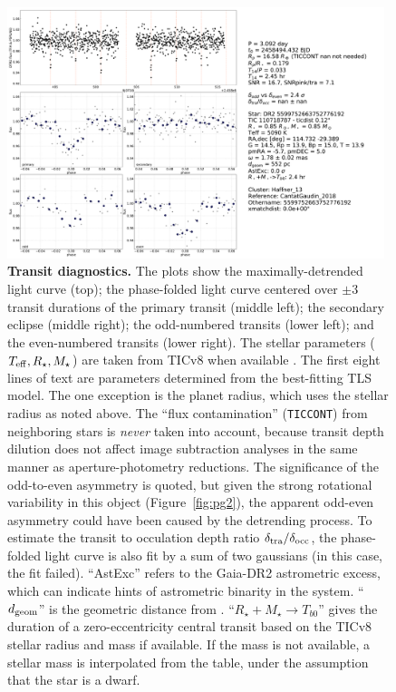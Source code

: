 \documentclass[12pt,twocolumn,tighten]{aastex62}
\begin{document}
\begin{figure}[!h]
	\begin{center}
		\leavevmode
		\includegraphics[width=0.98\textwidth]{gaiatwo0005599752663752776192-0007_page03.pdf}
	\end{center}
	\vspace{-0.5cm}
	\caption{
    {\bf Transit diagnostics.}
    The plots show the maximally-detrended light curve (top); the
    phase-folded light curve centered over $\pm3$ transit durations of
    the primary transit (middle left); the secondary eclipse (middle
    right); the odd-numbered transits (lower left); and the
    even-numbered transits (lower right).
    The stellar parameters ($T_{\rm eff}, R_\star, M_\star$) are taken
    from TICv8 when available \citep{stassun_TIC8_2019}.
    The first eight lines of text are parameters determined from the
    best-fitting TLS model.  The one exception is the planet radius,
    which uses the stellar radius as noted above.
    The ``flux contamination'' (\texttt{TICCONT}) from neighboring
    stars is {\it never} taken into account, because transit depth
    dilution does not affect image subtraction analyses in the same
    manner as aperture-photometry reductions.
    The significance of the odd-to-even asymmetry is quoted,
    but given the strong rotational variability in this object (Figure~\ref{fig:pg2}),
   	the apparent odd-even asymmetry could have been caused by the detrending process.
    To estimate the transit to occulation depth ratio $\delta_{\rm tra}/\delta_{\rm occ}$,
    the phase-folded light curve is also fit by a sum of two
    gaussians (in this case, the fit failed).
    ``AstExc'' refers to the Gaia-DR2 astrometric excess, which can
    indicate hints of astrometric binarity in the system.
    ``$d_{\rm geom}$'' is the geometric distance from
    \citet{bailer-jones_distances_2018}.
    ``$R_\star + M_\star \rightarrow T_{b0}$'' gives the duration of a
    zero-eccentricity central transit based on the TICv8 stellar
    radius and mass if available. If the mass is not available, a
    stellar mass is interpolated from the
    \citet{pecaut_intrinsic_2013} table, under the assumption that the
    star is a dwarf.
		\label{fig:pg3}
	}
\end{figure}
\end{document}
